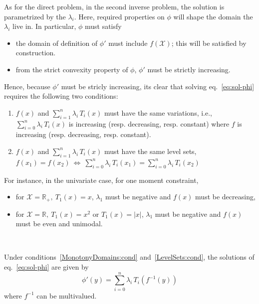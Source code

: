 \documentclass[english,sort&compress]{elsarticle}
\theoremstyle{definition}
\theoremstyle{plain}
\theoremstyle{plain}
\def\Rset{\mathbb{R}}
\def\X{\mathcal{X}}
\begin{document}
As  for the  direct problem,  in  the second  inverse problem,  the solution  is
parametrized by the $\lambda_i$. Here,  required properties on $\phi$ will shape
the  domain the  $\lambda_i$ live  in. In  particular, $\phi$  must satisfy
%
\begin{itemize}
\item the  domain of definition  of $\phi'$ must  include $f(\X)$; this  will be
  satisfied by construction.
%
\item from  the strict  convexity property of  $\phi$, $\phi'$ must  be strictly
  increasing.
\end{itemize}
%
Hence,  because $\phi'$  must  be  stricly increasing,  its  clear that  solving
eq.~\eqref{eq:sol-phi}  requires the following two conditions:
%
\begin{enumerate}[label=(C\arabic*)]
\item\label{MonotonyDomains:cond}   $f(x)$   and   $\displaystyle   \sum_{i=1}^n
  \lambda_i  \, T_i(x)$  must  have the  same  variations, i.e.,  $\displaystyle
  \sum_{i=0}^n   \lambda_i  \,   T_i(x)$  is   increasing  (resp.    decreasing,
  resp. constant) where $f$ is increasing (resp. decreasing, resp. constant).
%
\item\label{LevelSets:cond} $f(x)$ and  $\displaystyle \sum_{i=1}^n \lambda_i \,
  T_i(x)$ must have the same level  sets, $f(x_1) = f(x_2) \: \Leftrightarrow \:
  \displaystyle \sum_{i=0}^n  \lambda_i \, T_i(x_1) =  \sum_{i=0}^n \lambda_i \,
  T_i(x_2)$
\end{enumerate}
%
For instance, in the univariate case, for one moment constraint, %
%
\begin{itemize}
\item for $\X = \Rset_+, \: T_1(x) = x$, $\lambda_1$ must be negative and $f(x)$
  must be decreasing,
%
\item for $\X = \Rset, \: T_1(x) = x^2$ or $T_1(x) = |x|$, $\lambda_1$ must be
  negative and $f(x)$ must be even and unimodal.
\end{itemize}

\

Under  conditions~\ref{MonotonyDomains:cond} and~\ref{LevelSets:cond}, the
solutions of eq.~\eqref{eq:sol-phi} are given by
%
\begin{equation}\label{eq:derivative-phi}
\phi'(y) = \sum_{i=0}^n \lambda_i \, T_i\!\left(f^{-1}(y)\right)
\end{equation}
%
where $f^{-1}$ can be multivalued.
\end{document}
